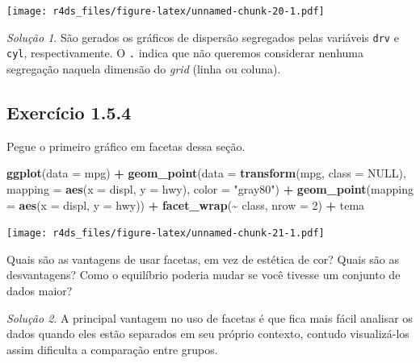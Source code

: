 \documentclass[
]{latex/krantz}
\newenvironment{Shaded}{\begin{snugshade}}{\end{snugshade}}
\newcommand{\AttributeTok}[1]{\textcolor[rgb]{0.13,0.29,0.53}{#1}}
\newcommand{\ConstantTok}[1]{\textcolor[rgb]{0.56,0.35,0.01}{#1}}
\newcommand{\DecValTok}[1]{\textcolor[rgb]{0.00,0.00,0.81}{#1}}
\newcommand{\FunctionTok}[1]{\textcolor[rgb]{0.13,0.29,0.53}{\textbf{#1}}}
\newcommand{\NormalTok}[1]{#1}
\newcommand{\SpecialCharTok}[1]{\textcolor[rgb]{0.81,0.36,0.00}{\textbf{#1}}}
\newcommand{\StringTok}[1]{\textcolor[rgb]{0.31,0.60,0.02}{#1}}
\theoremstyle{definition}
\theoremstyle{definition}
\theoremstyle{definition}
\theoremstyle{definition}
\theoremstyle{remark}
\newtheorem*{solution}{Solução}
\begin{document}
\texttt{[image: r4ds\_files/figure-latex/unnamed-chunk-20-1.pdf]}

\begin{solution}
São gerados os gráficos de dispersão segregados pelas variáveis \texttt{drv} e \texttt{cyl}, respectivamente. O \texttt{.} indica que não queremos considerar nenhuma segregação naquela dimensão do \emph{grid} (linha ou coluna).
\end{solution}

\hypertarget{exr1-5-4}{%
\subsection*{Exercício 1.5.4}\label{exr1-5-4}}

Pegue o primeiro gráfico em facetas dessa seção.

\begin{Shaded}
\begin{Highlighting}[]
\FunctionTok{ggplot}\NormalTok{(}\AttributeTok{data =}\NormalTok{ mpg) }\SpecialCharTok{+}
    \FunctionTok{geom\_point}\NormalTok{(}\AttributeTok{data =} \FunctionTok{transform}\NormalTok{(mpg, }\AttributeTok{class =} \ConstantTok{NULL}\NormalTok{), }\AttributeTok{mapping =} \FunctionTok{aes}\NormalTok{(}\AttributeTok{x =}\NormalTok{ displ, }\AttributeTok{y =}\NormalTok{ hwy), }\AttributeTok{color =} \StringTok{"gray80"}\NormalTok{) }\SpecialCharTok{+}
    \FunctionTok{geom\_point}\NormalTok{(}\AttributeTok{mapping =} \FunctionTok{aes}\NormalTok{(}\AttributeTok{x =}\NormalTok{ displ, }\AttributeTok{y =}\NormalTok{ hwy)) }\SpecialCharTok{+}
    \FunctionTok{facet\_wrap}\NormalTok{(}\SpecialCharTok{\textasciitilde{}}\NormalTok{ class, }\AttributeTok{nrow =} \DecValTok{2}\NormalTok{) }\SpecialCharTok{+}
\NormalTok{    tema}
\end{Highlighting}
\end{Shaded}

\texttt{[image: r4ds\_files/figure-latex/unnamed-chunk-21-1.pdf]}

Quais são as vantagens de usar facetas, em vez de estética de cor? Quais são as desvantagens? Como o equilíbrio poderia mudar se você tivesse um conjunto de dados maior?

\begin{solution}
A principal vantagem no uso de facetas é que fica mais fácil analisar os dados quando eles estão separados em seu próprio contexto, contudo visualizá-los assim dificulta a comparação entre grupos.
\end{solution}
\end{document}
